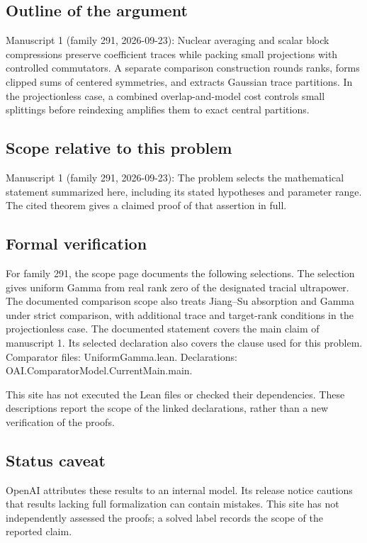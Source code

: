 \documentclass[11pt]{article}
\begin{document}
\subsection{Outline of the argument}
Manuscript 1 (family 291, 2026-09-23): Nuclear averaging and scalar block compressions preserve coefficient traces while packing small projections with controlled commutators. A separate comparison construction rounds ranks, forms clipped sums of centered symmetries, and extracts Gaussian trace partitions. In the projectionless case, a combined overlap-and-model cost controls small splittings before reindexing amplifies them to exact central partitions.

\subsection{Scope relative to this problem}
Manuscript 1 (family 291, 2026-09-23): The problem selects the mathematical statement summarized here, including its stated hypotheses and parameter range. The cited theorem gives a claimed proof of that assertion in full.

\subsection{Formal verification}
For family 291, the scope page documents the following selections. The selection gives uniform Gamma from real rank zero of the designated tracial ultrapower. The documented comparison scope also treats Jiang--Su absorption and Gamma under strict comparison, with additional trace and target-rank conditions in the projectionless case. The documented statement covers the main claim of manuscript 1. Its selected declaration also covers the clause used for this problem. Comparator files: UniformGamma.lean. Declarations: OAI.ComparatorModel.CurrentMain.main.

This site has not executed the Lean files or checked their dependencies. These descriptions report the scope of the linked declarations, rather than a new verification of the proofs.

\subsection{Status caveat}
OpenAI attributes these results to an internal model. Its release notice cautions that results lacking full formalization can contain mistakes. This site has not independently assessed the proofs; a solved label records the scope of the reported claim.
\end{document}
